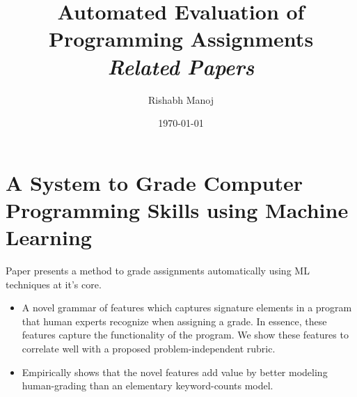 \documentclass{article}
\title{Automated Evaluation of Programming Assignments \\ \vspace{0.5mm} \large\textit{Related Papers}}
\author{Rishabh Manoj}
\date{\today}
\begin{document}
\maketitle

\section{A System to Grade Computer Programming Skills using
Machine Learning \cite{KDD}} 

Paper presents a method to grade assignments automatically using ML techniques at it's core. 

\begin{itemize}
    \item A novel grammar of features which captures signature elements in a program that human experts recognize when assigning a grade. In essence,
these features capture the functionality of the program. We show these features to correlate well with a proposed problem-independent rubric.\\

    \item Empirically shows that the novel features add value by better modeling human-grading than an elementary keyword-counts model.\\

\end{itemize}
\end{document}
